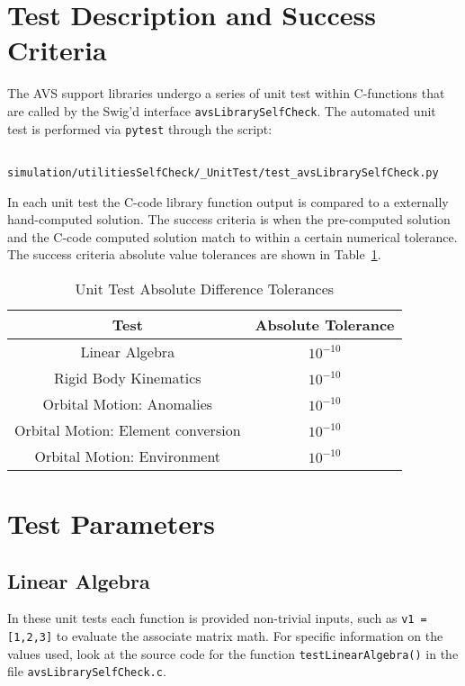 
\section{Test Description and Success Criteria}
The AVS support libraries undergo a series of unit test within C-functions that are called by the Swig'd interface {\tt avsLibrarySelfCheck}.  The automated unit test is performed via {\tt pytest} through the script:
\begin{verbatim}
     simulation/utilitiesSelfCheck/_UnitTest/test_avsLibrarySelfCheck.py
\end{verbatim}
In each unit test the C-code library function output is compared to a externally hand-computed solution.  The success criteria is when the pre-computed solution and the C-code computed solution match to within a certain numerical tolerance.  The success criteria absolute value tolerances are shown in Table~\ref{tbl:tolerance}.



\begin{table}[htbp]
	\caption{Unit Test Absolute Difference Tolerances}
	\label{tbl:tolerance}
	\centering \fontsize{10}{10}\selectfont
	\begin{tabular}{c | c} %
		\hline 
		\hline 
		Test    & Absolute Tolerance \\
		\hline 
		  Linear Algebra    & $10^{-10}$ \\
		  Rigid Body Kinematics    & $10^{-10}$ \\
		  Orbital Motion: Anomalies    & $10^{-10}$ \\
		  Orbital Motion: Element conversion    & $10^{-10}$ \\
		  Orbital Motion: Environment    & $10^{-10}$ \\
		\hline
		\hline
	\end{tabular}
\end{table}





\section{Test Parameters}

\subsection{Linear Algebra}
In these unit tests each function is provided non-trivial inputs, such as {\tt v1 = [1,2,3]} to evaluate the associate matrix math.  For specific information on the values used, look at the source code for the function {\tt testLinearAlgebra()} in the file {\tt avsLibrarySelfCheck.c}.  

